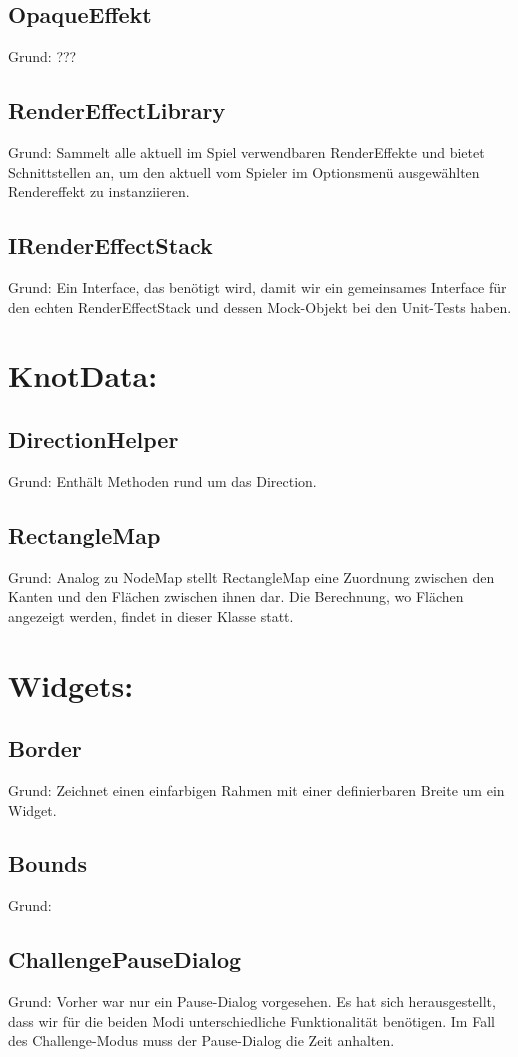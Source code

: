\subsection{OpaqueEffekt}
Grund: ???
\subsection{RenderEffectLibrary}
Grund: Sammelt alle aktuell im Spiel verwendbaren RenderEffekte und bietet Schnittstellen an, um den aktuell vom Spieler im Optionsmenü ausgewählten Rendereffekt zu instanziieren.
\subsection{IRenderEffectStack}
Grund: Ein Interface, das benötigt wird, damit wir ein gemeinsames Interface für den echten RenderEffectStack und dessen Mock-Objekt bei den Unit-Tests haben.

\section{KnotData:}
\subsection{DirectionHelper}
Grund: Enthält Methoden rund um das Direction.
\subsection{RectangleMap}
Grund: Analog zu NodeMap stellt RectangleMap eine Zuordnung zwischen den Kanten und den Flächen zwischen ihnen dar. Die Berechnung, wo Flächen angezeigt werden, findet in dieser Klasse statt.

\section{Widgets:}
\subsection{Border}
Grund: Zeichnet einen einfarbigen Rahmen mit einer definierbaren Breite um ein Widget.
\subsection{Bounds}
Grund:
\subsection{ChallengePauseDialog}
Grund: Vorher war nur ein Pause-Dialog vorgesehen. Es hat sich herausgestellt, dass wir für die beiden Modi unterschiedliche Funktionalität benötigen. Im Fall des Challenge-Modus muss der Pause-Dialog die Zeit anhalten.
